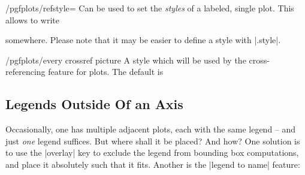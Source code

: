 \begin{key}{/pgfplots/refstyle=}
    Can be used to set the \emph{styles} of a labeled, single plot. This allows
    to write
\begin{codeexample}
\addplot[/pgfplots/refstyle={pgfplots:label2}]
\end{codeexample}
    \noindent somewhere. Please note that it may be easier to define a style
    with |.style|.
\end{key}

\begin{stylekey}{/pgfplots/every crossref picture}
    A style which will be used by the cross-referencing feature for plots. The
    default is
\begin{codeexample}
\end{codeexample}
\end{stylekey}



\subsection{Legends Outside Of an Axis}

Occasionally, one has multiple adjacent plots, each with the same legend -- and
just \emph{one} legend suffices. But where shall it be placed? And how? One
solution is to use the |overlay| key to exclude the legend from bounding box
computations, and place it absolutely such that it fits. Another is the
|legend to name| feature:


